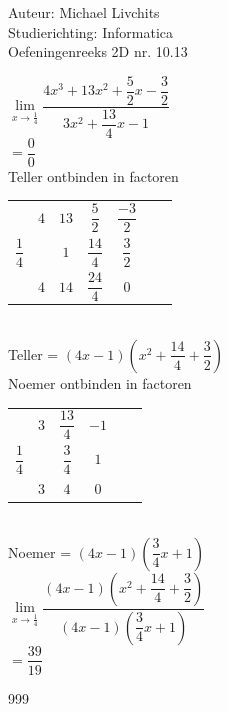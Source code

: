 \documentclass[a4paper]{article}
\begin{document}
  
\noindent \large Auteur: Michael Livchits \\
\noindent \large Studierichting: Informatica\\
\noindent \large Oefeningenreeks 2D nr. 10.13\\

\medskip

\normalsize

$ \lim\limits_{x\rightarrow \tfrac{1}{4}} \dfrac{4x^3+13x^2+\dfrac{5}{2}x-\dfrac{3}{2}}{3x^2+\dfrac{13}{4}x-1}$\\

$ = \dfrac{0}{0}$\\

Teller ontbinden in factoren\\

\begin{tabular}{c|cccccc}
	& $4$ 	& $13$ 	& $\dfrac{5}{2}$ 	& $\dfrac{-3}{2}$ 	 	\\
$\dfrac{1}{4}$ 	& 		& $1$ 	& $\dfrac{14}{4}$ 	& $\dfrac{3}{2}$  			\\ \hline
	& $4$   & $14$ 	& $\dfrac{24}{4}$ 	& \multicolumn{1}{|c}{$0$}  \\
\end{tabular}\\

Teller = $(4x-1)\left(x^2+\dfrac{14}{4}+\dfrac{3}{2}\right)$\\

Noemer ontbinden in factoren\\

\begin{tabular}{c|ccccc}
	& $3$ 	& $\dfrac{13}{4}$ 	& $-1$ 	\\
$\dfrac{1}{4}$ 	& 		& $\dfrac{3}{4}$ 	& $1$ \\ \hline
	& $3$   & $4$ 	& \multicolumn{1}{|c}{$0$}  \\
\end{tabular}\\

Noemer = $(4x-1)\left(\dfrac{3}{4}x+1\right)$\\

$ \lim\limits_{x\rightarrow \tfrac{1}{4}} \dfrac{(4x-1)\left(x^2+\dfrac{14}{4}+\dfrac{3}{2}\right)}{(4x-1)\left(\dfrac{3}{4}x+1\right)}$\\

$= \dfrac{39}{19}$

\begin{thebibliography}{999}
\end{thebibliography}
\end{document}
